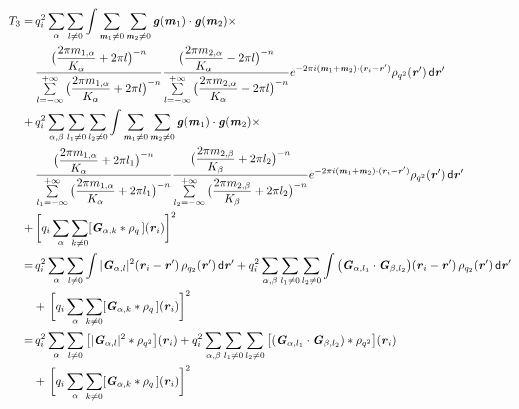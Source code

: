\documentclass[aps,pre,preprint]{revtex4}
\renewcommand{\v}[1]{\textbf{\textit{#1}}}
\renewcommand{\d}[1]{\textsf{#1}}
\begin{document}
\begin{align}\nonumber
  T_3 = &\,
  q_i^2\sum_{\alpha}\sum_{l\neq 0}
  \int
  \sum_{\v m_1\neq 0}\sum_{\v m_2\neq 0}
  \v g(\v m_1)\cdot\v g(\v m_2) \times\\\nonumber
  &\,
  \frac
  {\big(\dfrac{2\pi m_{1,\alpha}}{K_\alpha} + 2\pi l\big)^{-n}}
  {\sum\limits_{l=-\infty}^{+\infty}
    \big(\dfrac{2\pi m_{1,\alpha}}{K_\alpha} + 2\pi l\big)^{-n}}
  \frac
  {\big(\dfrac{2\pi m_{2,\alpha}}{K_\alpha} - 2\pi l\big)^{-n}}
  {\sum\limits_{l=-\infty}^{+\infty}
    \big(\dfrac{2\pi m_{2,\alpha}}{K_\alpha} - 2\pi l\big)^{-n}}
  e^{-2\pi i (\v m_1 + \v m_2)\cdot(\v r_i - \v r')}\rho_{q^2}(\v r')
  \,\d d\v r' \\\nonumber
  + & \,
  q_i^2\sum_{\alpha, \beta}\sum_{l_1\neq 0}\sum_{l_2\neq 0}
  \int
  \sum_{\v m_1\neq 0}\sum_{\v m_2\neq 0}
  \v g(\v m_1)\cdot\v g(\v m_2) \times\\\nonumber
  &\,
  \frac
  {\big(\dfrac{2\pi m_{1,\alpha}}{K_\alpha} + 2\pi l_1\big)^{-n}}
  {\sum\limits_{l_1=-\infty}^{+\infty}
    \big(\dfrac{2\pi m_{1,\alpha}}{K_\alpha} + 2\pi l_1\big)^{-n}}
  \frac
  {\big(\dfrac{2\pi m_{2,\beta}}{K_\beta} + 2\pi l_2\big)^{-n}}
  {\sum\limits_{l_2=-\infty}^{+\infty}
    \big(\dfrac{2\pi m_{2,\beta}}{K_\beta} + 2\pi l_2\big)^{-n}}  
  e^{-2\pi i (\v m_1 + \v m_2)\cdot(\v r_i - \v r')}\rho_{q^2}(\v r')
  \,\d d\v r' \\\nonumber
  + &\,
  \bigg[
  q_i \sum_{\alpha}\sum_{k\neq 0}
  [\v G_{\alpha,k}\ast\rho_q\,] (\v r_i)
  \bigg]^2  \\\nonumber
  = &\,
  q_i^2\sum_{\alpha}\sum_{l\neq 0}
  \int \vert \v G_{\alpha,l}\vert^2(\v r_i - \v r')
  \,\rho_{q_2}(\v r')
  \,\d d\v r'
  +
  q_i^2\sum_{\alpha, \beta}\sum_{l_1\neq 0}\sum_{l_2\neq 0}
  \int
  \big(
  \v G_{\alpha,l_1}\cdot\v G_{\beta,l_2}
  \big)
  (\v r_i - \v r')
  \,\rho_{q_2}(\v r')
  \,\d d\v r'
  \\\nonumber
  &+ \,
  \bigg[
  q_i \sum_{\alpha}\sum_{k\neq 0}
  [\v G_{\alpha,k}\ast\rho_q\,] (\v r_i)
  \bigg]^2  \\\nonumber
  = &\,
  q_i^2\sum_{\alpha}\sum_{l\neq 0}
  \big[
  \vert\v G_{\alpha,l}\vert^2 \ast\rho_{q^2}
  \big](\v r_i)
  +
  q_i^2\sum_{\alpha, \beta}\sum_{l_1\neq 0}\sum_{l_2\neq 0}
  \big[
  (
  \v G_{\alpha,l_1}\cdot\v G_{\beta,l_2}
  )
  \ast\rho_{q^2}
  \big]
  (\v r_i) \\\nonumber
  &+ \,
  \bigg[
  q_i \sum_{\alpha}\sum_{k\neq 0}
  [\v G_{\alpha,k}\ast\rho_q\,] (\v r_i)
  \bigg]^2  \\\nonumber

\end{align}
\end{document}
